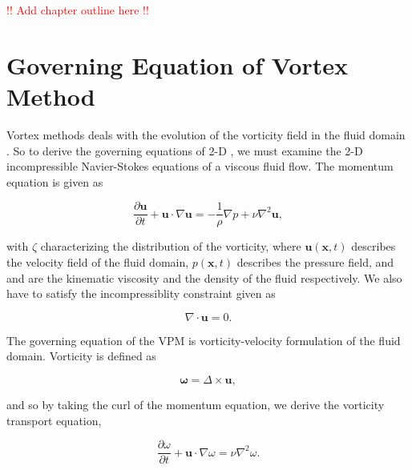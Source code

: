 \textcolor{red}{!! Add chapter outline here !!}

\section{Governing Equation of Vortex Method}

Vortex methods deals with the evolution of the vorticity field in the fluid domain \cite{Cottet2000a}. So to derive the governing equations of 2-D , we must examine the 2-D incompressible Navier-Stokes equations of a viscous fluid flow. The momentum equation is given as


\begin{equation}
\frac{\partial \mathbf{u}}{\partial t} + \mathbf{u}\cdot\nabla\mathbf{u} = - \frac{1}{\rho} \nabla p + \nu \nabla^2\mathbf{u},
\label{eq:mom}
\end{equation}

with $\zeta$ characterizing the distribution of the vorticity, where $\mathbf{u}\left(\mathbf{x},t\right)$  describes the velocity field of the fluid domain, $p\left(\mathbf{x},t\right)$  describes the pressure field, and  and  are the kinematic viscosity and the density of the fluid respectively. We also have to satisfy the incompressiblity constraint given as

\begin{equation}
\nabla\cdot\mathbf{u} = 0.
\end{equation}

The governing equation of the VPM is vorticity-velocity formulation of the fluid domain. Vorticity   is defined as

\begin{equation}
\mathbf{\omega} = \Delta \times \mathbf{u},
\end{equation}

and so by taking the curl of the momentum equation, we derive the vorticity transport equation, 

\begin{equation}
\frac{\partial \omega}{\partial t} + \mathbf{u}\cdot\nabla\omega = \nu \nabla^2 \omega.
\end{equation}

